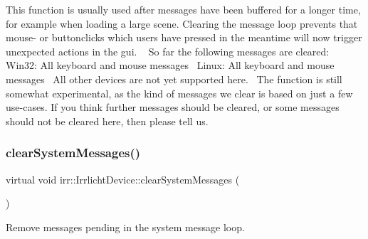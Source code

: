 This function is usually used after messages have been buffered for a longer time, for example when loading a large scene. Clearing the message loop prevents that mouse-\/ or buttonclicks which users have pressed in the meantime will now trigger unexpected actions in the gui. ~\newline
 So far the following messages are cleared\+:~\newline
 Win32\+: All keyboard and mouse messages~\newline
 Linux\+: All keyboard and mouse messages~\newline
 All other devices are not yet supported here.~\newline
 The function is still somewhat experimental, as the kind of messages we clear is based on just a few use-\/cases. If you think further messages should be cleared, or some messages should not be cleared here, then please tell us. \mbox{\label{classirr_1_1IrrlichtDevice_aa10c6151a267d8a1500d5dc7b44425dd}} 
\subsubsection{\texorpdfstring{clear\+System\+Messages()}{clearSystemMessages()}\hspace{0.1cm}{\footnotesize\ttfamily [2/3]}}
{\footnotesize\ttfamily virtual void irr\+::\+Irrlicht\+Device\+::clear\+System\+Messages (\begin{DoxyParamCaption}{ }\end{DoxyParamCaption})\hspace{0.3cm}{\ttfamily [pure virtual]}}



Remove messages pending in the system message loop. 

